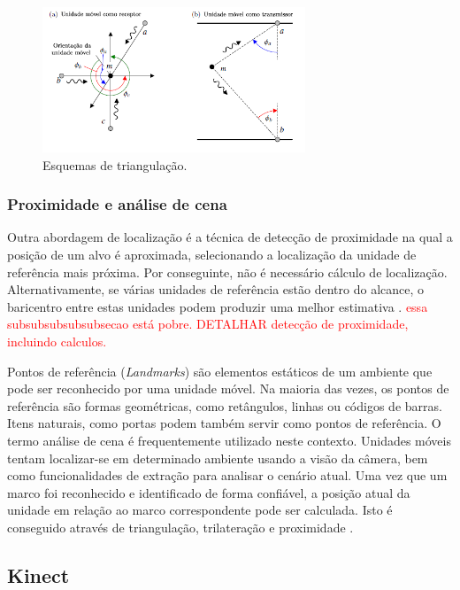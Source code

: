 \begin{figure}[ht]
\centering
\includegraphics[resolution=300,width=0.7\textwidth,natwidth=610,natheight=642]{images/triangulacao.png}
    \caption{Esquemas de triangulação.}
    \label{fig:triang}
\end{figure}
 
\subsubsection{Proximidade e análise de cena}\label{sec:proximidade}
Outra abordagem de localização é a técnica de detecção de proximidade na qual a posição de um alvo é aproximada, selecionando a localização da unidade de referência mais próxima. Por conseguinte, não é necessário cálculo de localização. Alternativamente, se várias unidades de referência estão dentro do alcance, o baricentro entre estas unidades podem produzir uma melhor estimativa \cite{EHuber1996}.
 \textcolor{red}{essa subsubsubsubsubsecao está pobre. DETALHAR detecção de proximidade, incluindo calculos.}

Pontos de referência (\textit{Landmarks}) são elementos estáticos de um ambiente que pode ser reconhecido por uma unidade móvel. Na maioria das vezes, os pontos de referência são formas geométricas, como retângulos, linhas ou códigos de barras. Itens naturais, como portas podem também servir como pontos de referência. O termo  análise de cena é frequentemente utilizado neste contexto. Unidades móveis tentam localizar-se  em determinado ambiente usando a visão da câmera, bem como funcionalidades de extração para analisar o cenário atual. Uma vez que um marco foi reconhecido e identificado de forma confiável, a posição atual da unidade em relação ao marco correspondente pode ser calculada. Isto é conseguido através de triangulação, trilateração e proximidade \cite{linde2006aspects}.
 
 \subsection{Kinect}\label{sec:kinect}
 
